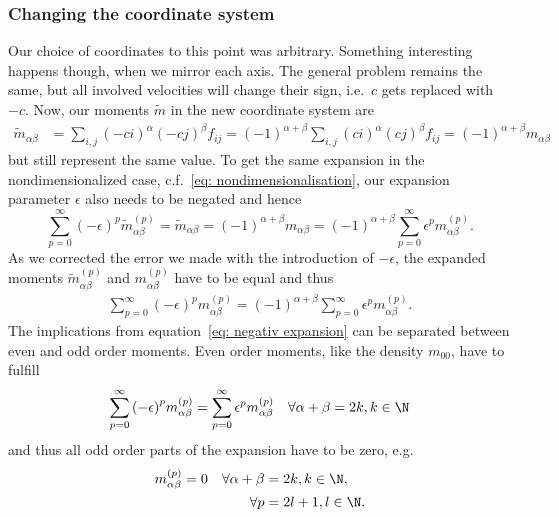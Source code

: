 \subsubsection{Changing the coordinate system}
\label{subs: Changing the coordinate system}
Our choice of coordinates to this point was arbitrary.
Something interesting happens though, when we mirror each axis.
The general problem remains the same, but all involved velocities will change their sign, i.e.\ $c$ gets replaced with $-c$.
Now, our moments $\tilde{m}$ in the new coordinate system are
\begin{align}
  \tilde{m}_{\alpha\beta} &= \sum_{i,j} {(-ci)}^\alpha {(-cj)}^\beta f_{ij}
  ={(-1)}^{\alpha + \beta} \sum_{i,j} {(ci)}^\alpha {(cj)}^\beta f_{ij}
  ={(-1)}^{\alpha + \beta} m_{\alpha\beta}
\end{align}
but still represent the same value.
To get the same expansion in the nondimensionalized case, c.f.~\eqref{eq: nondimensionalisation}, our expansion parameter $\epsilon$ also needs to be negated and hence
\begin{equation}
     \sum_{p=0}^{\infty} {(-\epsilon)}^p \tilde{m}_{\alpha\beta}^{(p)}
     = \tilde{m}_{\alpha\beta}
     = {(-1)}^{\alpha + \beta}  m_{\alpha\beta}
     = {(-1)}^{\alpha + \beta} \sum_{p=0}^{\infty} \epsilon^p m_{\alpha\beta}^{(p)}.
\end{equation}
As we corrected the error we made with the introduction of $-\epsilon$, the expanded moments $\tilde{m}_{\alpha\beta}^{(p)}$ and $m_{\alpha\beta}^{(p)}$ have to be equal and thus
\begin{align}
  \label{eq: negativ expansion}
  \sum_{p=0}^{\infty} {(-\epsilon)}^p m_{\alpha\beta}^{(p)}
  = {(-1)}^{\alpha + \beta} \sum_{p=0}^{\infty} \epsilon^p m_{\alpha\beta}^{(p)}.
\end{align}
The implications from equation~\eqref{eq: negativ expansion} can be separated between even and odd order moments.
Even order moments, like the density $m_{00}$, have to fulfill
\begin{align}
  \label{eq: negativ expansion even}
  \sum_{p=0}^{\infty} {(-\epsilon)}^p m_{\alpha\beta}^{(p)}
  = \sum_{p=0}^{\infty} \epsilon^p m_{\alpha\beta}^{(p)} \quad \forall \alpha+\beta=2k, k\in\N
\end{align}
and thus all odd order parts of the expansion have to be zero, e.g.
\begin{equation}
  \label{eq: kill even moments odd order}
  \begin{aligned}
    m_{\alpha\beta}^{(p)} = 0 \quad
    \forall\alpha+\beta & = 2k, k\in\N, \\
    \forall p & = 2l+1, l\in\N.
  \end{aligned}
\end{equation}
